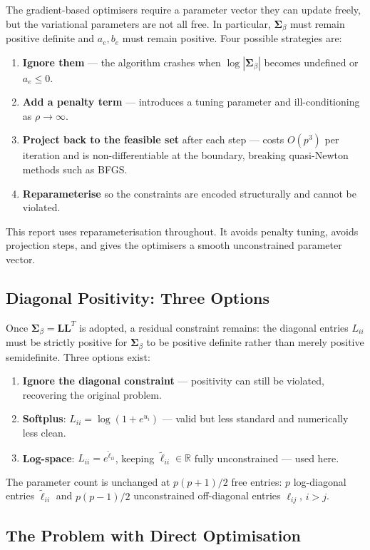 \documentclass[11pt,a4paper]{article}
\newcommand{\R}{\mathbb{R}}
\begin{document}
The gradient-based optimisers require a parameter vector they can update freely, but the variational parameters are not all free. In particular, $\bm{\Sigma}_\beta$ must remain positive definite and $a_e,b_e$ must remain positive. Four possible strategies are:
\begin{enumerate}
  \item \textbf{Ignore them} --- the algorithm crashes when $\log|\bm{\Sigma}_\beta|$ becomes undefined or $a_e \leq 0$.
  \item \textbf{Add a penalty term} --- introduces a tuning parameter and ill-conditioning as $\rho \to \infty$.
  \item \textbf{Project back to the feasible set} after each step --- costs $O(p^3)$ per iteration and is non-differentiable at the boundary, breaking quasi-Newton methods such as BFGS.
  \item \textbf{Reparameterise} so the constraints are encoded structurally and cannot be violated.
\end{enumerate}
This report uses reparameterisation throughout. It avoids penalty tuning, avoids projection steps, and gives the optimisers a smooth unconstrained parameter vector.

\subsection*{Diagonal Positivity: Three Options}

Once $\bm{\Sigma}_\beta = \bm{L}\bm{L}^T$ is adopted, a residual constraint remains: the diagonal entries $L_{ii}$ must be strictly positive for $\bm{\Sigma}_\beta$ to be positive definite rather than merely positive semidefinite. Three options exist:
\begin{enumerate}
  \item \textbf{Ignore the diagonal constraint} --- positivity can still be violated, recovering the original problem.
  \item \textbf{Softplus}: $L_{ii} = \log(1 + e^{u_i})$ --- valid but less standard and numerically less clean.
  \item \textbf{Log-space}: $L_{ii} = e^{\tilde{\ell}_{ii}}$, keeping $\tilde{\ell}_{ii} \in \R$ fully unconstrained --- used here.
\end{enumerate}
The parameter count is unchanged at $p(p+1)/2$ free entries: $p$ log-diagonal entries $\tilde{\ell}_{ii}$ and $p(p-1)/2$ unconstrained off-diagonal entries $\ell_{ij}$, $i > j$.

\subsection*{The Problem with Direct Optimisation}
\end{document}
